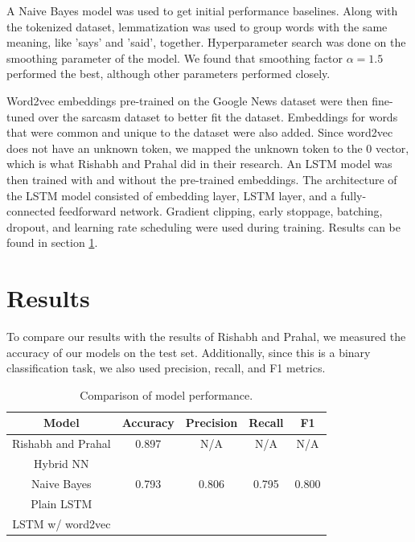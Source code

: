 \documentclass[11pt]{article}
\begin{document}
A Naive Bayes model was used to get initial performance baselines.
Along with the tokenized dataset,
lemmatization was used to group words with the same meaning,
like 'says' and 'said', together.
Hyperparameter search was done on the smoothing parameter of the model.
We found that smoothing factor $ \alpha = 1.5 $ performed the best,
although other parameters performed closely.

Word2vec embeddings pre-trained on the Google News dataset
were then fine-tuned over the sarcasm dataset to better fit the dataset. \cite{google-word2vec}
Embeddings for words that were common and unique to the dataset were also added.
Since word2vec does not have an unknown token,
we mapped the unknown token to the 0 vector,
which is what Rishabh and Prahal did in their research. \cite{misra2023Sarcasm}
An LSTM model was then trained with and without the pre-trained embeddings.
The architecture of the LSTM model consisted of
embedding layer, LSTM layer, and a fully-connected feedforward network.
Gradient clipping, early stoppage, batching, dropout,
and learning rate scheduling were used during training.
Results can be found in section \ref{sec:res}.


\section{Results}\label{sec:res}

To compare our results with the results of Rishabh and Prahal,
we measured the accuracy of our models on the test set. \cite{misra2023Sarcasm}
Additionally, since this is a binary classification task,
we also used precision, recall, and F1 metrics.


\begin{table}[tbh]
    \centering
    \begin{tabular}{|c|c|c|c|c|}
        \hline
        Model              & Accuracy & Precision & Recall & F1    \\
        \hline
        Rishabh and Prahal & 0.897    & N/A       & N/A    & N/A   \\
        Hybrid NN          &          &           &        &       \\
        \hline
        Naive Bayes        & 0.793    & 0.806     & 0.795  & 0.800 \\
        \hline
        Plain LSTM         &          &           &        &       \\
        \hline
        LSTM w/ word2vec   &          &           &        &       \\
        \hline
    \end{tabular}
    \caption{Comparison of model performance.}
    \label{tab:perf}
\end{table}
\end{document}

